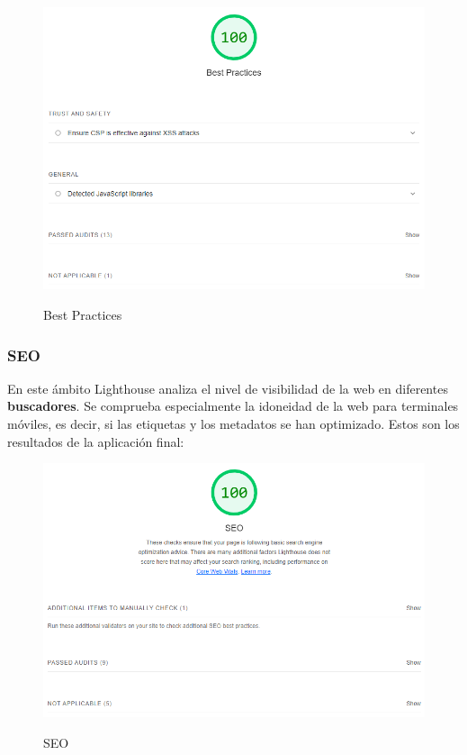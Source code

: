 \documentclass[12pt,twoside,titlepage]{report}
\begin{document}
\begin{figure}[H]
    \centering
    \includegraphics[scale=0.6]{Lighthouse/BestPractices}
    \label{fig:Lighthouse_bestpractices}
    \caption{Best Practices}
\end{figure}

\subsubsection{SEO}

En este ámbito Lighthouse analiza el nivel de visibilidad de la web en diferentes \textbf{buscadores}. Se comprueba especialmente la idoneidad de la web para terminales móviles, es decir, si las etiquetas y los metadatos se han optimizado. Estos son los resultados de la aplicación final:

\begin{figure}[H]
    \centering
    \includegraphics[scale=0.6]{Lighthouse/SEO}
    \label{fig:Lighthouse_seo}
    \caption{SEO}
\end{figure}
\end{document}
